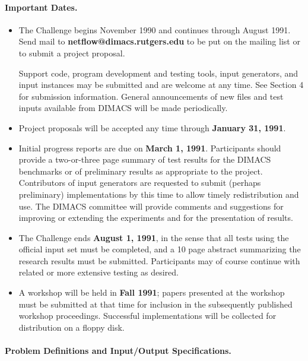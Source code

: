 \paragraph{Important Dates.}

\begin{itemize}
\item The Challenge begins November 1990 and continues through 
August 1991. Send mail to {\bf netflow@dimacs.rutgers.edu} to be put
on the mailing list or to submit a project proposal.

Support code, program development and testing tools, input generators,
and input instances may be submitted and are welcome at any time.  See
Section 4 for submission information.  General announcements of new
files and test inputs available from DIMACS will be made periodically.

\item Project proposals will be accepted any time through 
{\bf January 31, 1991}.

\item Initial progress reports are due on {\bf March 1, 1991}.  Participants   
should provide a two-or-three page summary of test results for the
DIMACS benchmarks or of preliminary results as appropriate to the
project.  Contributors of input generators are requested to submit
(perhaps preliminary) implementations by this time to allow timely
redistribution and use.  The DIMACS committee will provide comments
and suggestions for improving or extending the experiments and for 
the presentation of results. 

\item  The Challenge ends {\bf August 1, 1991}, in 
the sense that all tests using the official input set must be
completed, and a 10 page abstract summarizing the research results 
must be submitted.  Participants may of course 
continue with related or more extensive testing as desired.

\item A workshop will be held in {\bf Fall 1991};  papers presented
at the workshop must be submitted at that time for inclusion in the
subsequently published workshop proceedings.  Successful 
implementations will be collected for distribution on a floppy disk.
\end{itemize}

\paragraph{Problem Definitions and Input/Output Specifications.} 

